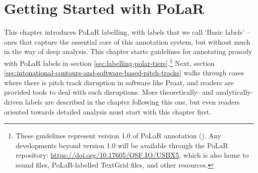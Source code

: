 \documentclass[11pt, twoside]{memoir}
\begin{document}
\chapter{Getting Started with PoLaR}\label{ch:basics}
This chapter introduces PoLaR labelling, with labels that we call ‘Basic labels’ – ones that capture the essential core of this annotation system, but without much in the way of deep analysis. This chapter starts guidelines for annotating prosody with PoLaR labels in section  \ref{sec:labelling-polar-tiers}.\footnote{These guidelines represent version 1.0 of PoLaR annotation (\citealt{ahn-21}). Any developments beyond version 1.0 will be available through the PoLaR repository: \href{https://doi.org/10.17605/OSF.IO/USBX5}{https://doi.org/10.17605/OSF.IO/USBX5}, which is also home to sound files, PoLaR-labelled TextGrid files, and other resources.} Next, section \ref{sec:intonational-contours-and-software-based-pitch-tracks} walks through cases where there is pitch track disruption in software like Praat, and readers are provided tools to deal with such disruptions. More theoretically- and analytically-driven labels are described in the chapter following this one, but even readers oriented towards detailed analysis must start with this chapter first.
\end{document}
